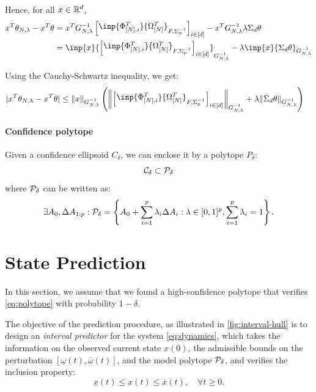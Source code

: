 \documentclass{article}
\begin{document}
Hence, for all $x\in\mathbb{R}^d$,
\begin{align*}
    x^T\theta_{N,\lambda}  -x^T\theta &= x^T G_{N, \lambda}^{-1}\begin{bmatrix}\inp{\Phi_{[N],i}^T}{\Omega_{[N]}^T}_{F, \Sigma_p^{-1}}\end{bmatrix}_{i\in[d]} 
    - x^T G_{N, \lambda}^{-1}\lambda\Sigma_d\theta\\
    &= \inp{x}{\begin{bmatrix}\inp{\Phi_{[N],i}^T}{\Omega_{[N]}^T}_{F, \Sigma_p^{-1}}\end{bmatrix}_{i\in[d]}}_{G_{N, \lambda}^{-1}} - \lambda\inp{x}{\Sigma_d\theta}_{G_{N, \lambda}^{-1}}
\end{align*}

Using the Cauchy-Schwartz inequality, we get:
\begin{align*}
    |x^T\theta_{N,\lambda}  -x^T\theta| &\leq \|x\|_{G_{N, \lambda}^{-1}}\left(\left\|\begin{bmatrix}\inp{\Phi_{[N],i}^T}{\Omega_{[N]}^T}_{F, \Sigma_p^{-1}}\end{bmatrix}_{i\in[d]}\right\|_{G_{N, \lambda}^{-1}} + \lambda\|\Sigma_d\theta\|_{G_{N, \lambda}^{-1}}\right)
\end{align*}

\paragraph{Confidence polytope}

Given a confidence ellipsoid $C_\delta$, we can enclose it by a polytope $P_\delta$:
\[\mathcal{C}_\delta \subset \mathcal{P}_\delta\]
where $\mathcal{P}_\delta$ can be written as:
\begin{equation}
     \exists A_0,\Delta A_{1:p}: \mathcal{P}_\delta = \left\{ A_{0}+\sum_{i=1}^{p}\lambda_{i}\Delta A_{i}: \lambda\in[0, 1]^p,  \sum_{i=1}^{p}\lambda_{i}=1\right\}.
\end{equation}


\section{State Prediction}

In this section, we assume that we found a high-confidence polytope that verifies \eqref{eq:polytope} with probability $1-\delta$.

The objective of the prediction procedure, as illustrated in \autoref{fig:interval-hull} is to design an \emph{interval predictor} for the system \eqref{eq:dynamics}, which takes the information on the observed current state ${x}({0})$, the admissible bounds on the perturbation $[\underline{\omega}(t),\overline{\omega}(t)]$, and the model polytope $\mathcal{P}_\delta$, and verifies the inclusion property:
\begin{equation}
\label{eq:interval_property}
\underline{x}(t)\leq x(t)\leq\overline{x}(t),\quad\forall t\geq0.
\end{equation}
\end{document}
